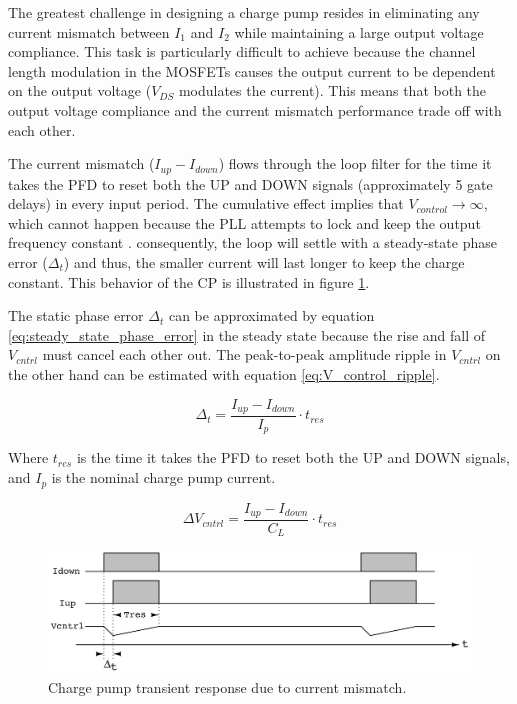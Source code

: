 \noindent The greatest challenge in designing a charge pump resides in eliminating any current mismatch between $I_1$ and $I_2$ while maintaining a
large output voltage compliance. This task is particularly difficult to achieve because the channel length modulation in the MOSFETs
causes the output current to be dependent on the output voltage ($V_{DS}$ modulates the current). This means that both the output voltage
compliance and the current mismatch performance trade off with each other.

The current mismatch ($I_{up} - I_{down}$) flows through the loop filter for the time it takes the PFD to reset both the UP and DOWN signals (approximately 5 gate delays) in every
input period. The cumulative effect implies that $V_{control} \to \infty $, which cannot happen because the PLL attempts to lock and keep the output frequency constant
\cite{Razavi_PLL_book}. consequently, the loop will settle with a steady-state phase error ($\Delta_t$) and thus, the smaller current will last longer to keep the charge
constant. This behavior of the CP is illustrated in figure \ref{fig:CP_transient_response}.

\noindent The static phase error $\Delta_t$ can be approximated by equation \eqref{eq:steady_state_phase_error} in the steady state because the rise and fall of $V_{cntrl}$ must cancel each 
other out. The peak-to-peak amplitude ripple in $V_{cntrl}$ on the other hand can be estimated with equation \eqref{eq:V_control_ripple}.

\pagebreak

\begin{equation}
    \Delta_t = \frac{I_{up} - I_{down}}{I_{p}} \cdot t_{res}
    \label{eq:steady_state_phase_error}
\end{equation}

\noindent Where $t_{res}$ is the time it takes the PFD to reset both the UP and DOWN signals, and $I_{p}$ is the nominal charge pump current.

\begin{equation}
    \Delta V_{cntrl} = \frac{I_{up} - I_{down}}{C_L} \cdot t_{res}
    \label{eq:V_control_ripple}
\end{equation}

\begin{figure}[H]
    \centering
    \includegraphics[width=1\textwidth]{figures/CP_transient_response.png}
    \caption{Charge pump transient response due to current mismatch.}
    \label{fig:CP_transient_response}
\end{figure}

